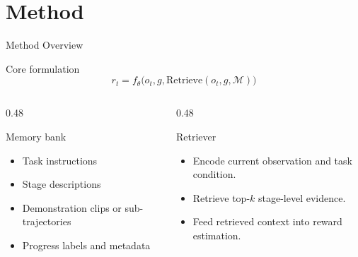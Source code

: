 \documentclass[aspectratio=169,11pt]{beamer}
\begin{document}
\section{Method}
\begin{frame}[t]{Method Overview}
\small
\begin{block}{Core formulation}
\[
r_t = f_\theta \bigl(o_t, g, \mathrm{Retrieve}(o_t, g, \mathcal{M}) \bigr)
\]
\end{block}

\begin{columns}[T,totalwidth=\textwidth]
  \begin{column}{0.48\textwidth}
    \begin{block}{Memory bank}
      \begin{itemize}
        \item Task instructions
        \item Stage descriptions
        \item Demonstration clips or sub-trajectories
        \item Progress labels and metadata
      \end{itemize}
    \end{block}
  \end{column}
  \begin{column}{0.48\textwidth}
    \begin{block}{Retriever}
      \begin{itemize}
        \item Encode current observation and task condition.
        \item Retrieve top-\(k\) stage-level evidence.
        \item Feed retrieved context into reward estimation.
      \end{itemize}
    \end{block}
  \end{column}
\end{columns}
\end{frame}
\end{document}
